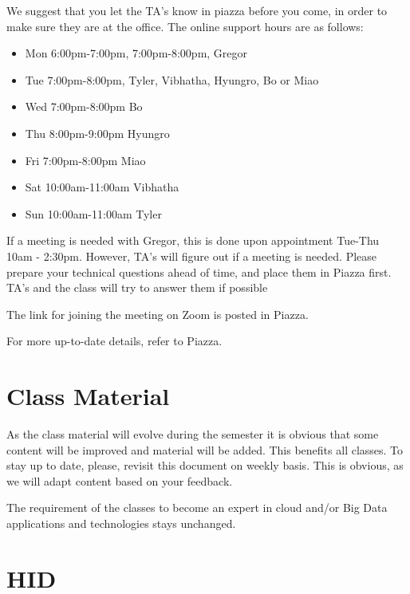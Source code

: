 We suggest that you let the TA's know in piazza before you come, in
order to make sure they are at the office.  The online support hours
are as follows:

\begin{itemize}
\item Mon 6:00pm-7:00pm, 7:00pm-8:00pm, Gregor 
\item Tue 7:00pm-8:00pm, Tyler, Vibhatha, Hyungro, Bo or Miao 
\item Wed 7:00pm-8:00pm Bo 
\item Thu 8:00pm-9:00pm Hyungro
\item Fri 7:00pm-8:00pm Miao
\item Sat 10:00am-11:00am Vibhatha 
\item Sun 10:00am-11:00am Tyler
\end{itemize}


If a meeting is needed with Gregor, this is done upon appointment
Tue-Thu 10am - 2:30pm. However, TA's will figure out if a meeting is
needed.  Please prepare your technical questions ahead of time, and
place them in Piazza first. TA's and the class will try to answer them
if possible

The link for joining the meeting on Zoom is posted in Piazza.



For more up-to-date details, refer to Piazza.

\section{Class Material}

\begin{WARNING}
  As the class material will evolve during the semester it is obvious
  that some content will be improved and material will be added. This
  benefits all classes. To stay up to date, please, revisit this
  document on weekly basis. This is obvious, as we will adapt content
  based on your feedback. 

  The requirement of the classes to become an expert in cloud and/or
  Big Data applications and technologies stays unchanged.
\end{WARNING}

\section{HID}

